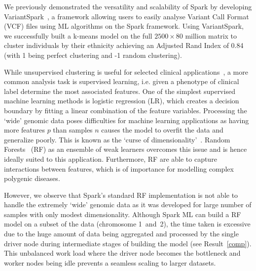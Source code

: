 \documentclass[10pt,letterpaper]{article}
\begin{document}
We previously demonstrated the versatility and scalability of Spark by developing VariantSpark~\cite{OBrien2015}, a
framework allowing users to easily analyse Variant Call Format (VCF) files using ML algorithms on the Spark framework.
Using VariantSpark, we successfully built a k-means model on the full
$2500 \times 80$ million matrix to cluster individuals by
their ethnicity achieving an Adjusted Rand Index of 0.84 (with 1 being perfect clustering  and -1 random clustering).


While unsupervised clustering is useful for selected clinical applications~\cite{Li2015}, a more common analysis task is
supervised learning, i.e. given a phenotype of clinical label determine the most associated features.  One of the
simplest supervised machine learning methods is logistic regression (LR), which creates a decision boundary by fitting a
linear combination of the feature variables.  Processing the `wide' genomic data poses difficulties for machine learning
applications as having more features $p$ than samples $n$ causes the model to overfit the data and generalize poorly.
This is known as the `curse of dimensionality'~\cite{Bauer2014}.  Random Forests~\cite{Breiman.2001} (RF) as an ensemble of weak learners 
overcomes this issue and is hence ideally suited to this application.  Furthermore, RF are able to capture interactions
between features, which is of importance for modelling complex polygenic diseases.



However, we observe that Spark's standard RF implementation is not able to handle the extremely `wide' genomic data as
it was developed for large number of samples with only modest dimensionality.  Although Spark ML can build a RF model on
a subset of the data (chromosome 1~and~2), the time taken is excessive due to the huge amount of data being aggregated
and processed by the single driver node during intermediate stages of building the model (see Result~\ref{comp}).  This
unbalanced work load where the driver node becomes the bottleneck and worker nodes being idle prevents a seamless
scaling to larger datasets.
\end{document}
